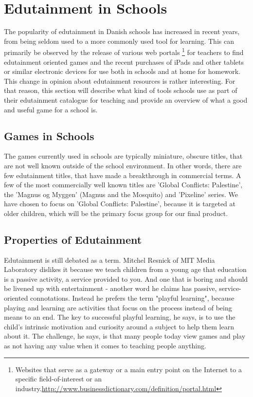 \section{Edutainment in Schools}
\label{sec:eduinsch}
The popularity of edutainment in Danish schools has increased in recent years, from being seldom used to a more commonly used tool for learning. 
This can primarily be observed by the release of various web portals \footnote{Websites that serve as a gateway or a main entry point on the Internet to a specific field-of-interest or an industry.\url{http://www.businessdictionary.com/definition/portal.html}} for teachers to find edutainment oriented games and the recent purchases of iPads and other tablets or similar electronic devices for use both in schools and at home for homework.
This change in opinion about edutainment resources is rather interesting. For that reason, this section will describe what kind of tools schools use as part of their edutainment catalogue for teaching and provide an overview of what a good and useful game for a school is.


\subsection{Games in Schools}

The games currently used in schools are typically miniature, obscure titles, that are not well known outside of the school environment.
In other words, there are few edutainment titles, that have made a breakthrough in commercial terms.
A few of the most commercially well known titles are 'Global Conflicts: Palestine', the 'Magnus og Myggen' (Magnus and the Mosquito) and 'Pixeline' series.
We have chosen to focus on 'Global Conflicts: Palestine', because it is targeted at older children, which will be the primary focus group for our final product.

\subsection{Properties of Edutainment}

Edutainment is still debated as a term. Mitchel Resnick of MIT Media Laboratory dislikes it because we teach children from a young age that education is a passive activity, a service provided to you. And one that is boring and should be livened up with entertainment - another word he claims has passive, service-oriented connotations. Instead he prefers the term "playful learning", because playing and learning are activities that focus on the process instead of being means to an end. The key to successful playful learning, he says, is to use the child's intrinsic motivation and curiosity around a subject to help them learn about it. The challenge, he says, is that many people today view games and play as not having any value when it comes to teaching people anything.\cite{edunoty} 

